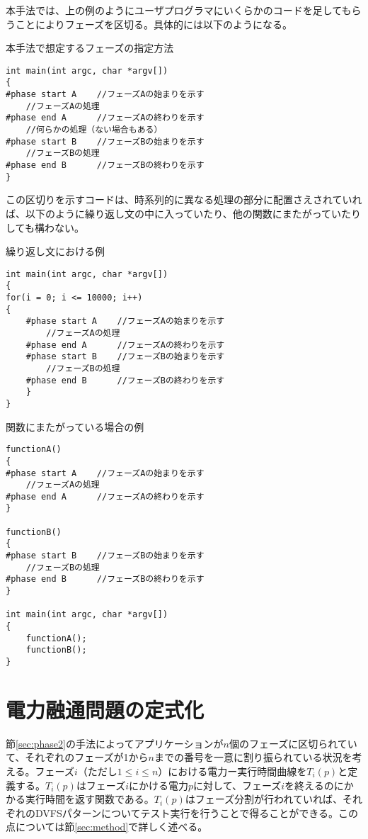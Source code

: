 本手法では、上の例のようにユーザプログラマにいくらかのコードを足してもらうことによりフェーズを区切る。具体的には以下のようになる。

{\small
\begin{itembox}[c]{本手法で想定するフェーズの指定方法}
\begin{verbatim}
int main(int argc, char *argv[])
{
#phase start A    //フェーズAの始まりを示す
    //フェーズAの処理
#phase end A      //フェーズAの終わりを示す
    //何らかの処理（ない場合もある）
#phase start B    //フェーズBの始まりを示す
    //フェーズBの処理
#phase end B      //フェーズBの終わりを示す
}
\end{verbatim}
\end{itembox}}

この区切りを示すコードは、時系列的に異なる処理の部分に配置さえされていれば、以下のように繰り返し文の中に入っていたり、他の関数にまたがっていたりしても構わない。

{\small
\begin{itembox}[c]{繰り返し文における例}
\begin{verbatim}
int main(int argc, char *argv[])
{
for(i = 0; i <= 10000; i++)
{
    #phase start A    //フェーズAの始まりを示す
        //フェーズAの処理
    #phase end A      //フェーズAの終わりを示す
    #phase start B    //フェーズBの始まりを示す
        //フェーズBの処理
    #phase end B      //フェーズBの終わりを示す
    }
}
\end{verbatim}
\end{itembox}}

{\small
\begin{itembox}[c]{関数にまたがっている場合の例}
\begin{verbatim}
functionA()
{
#phase start A    //フェーズAの始まりを示す
    //フェーズAの処理
#phase end A      //フェーズAの終わりを示す
}

functionB()
{
#phase start B    //フェーズBの始まりを示す
    //フェーズBの処理
#phase end B      //フェーズBの終わりを示す
}

int main(int argc, char *argv[])
{
    functionA();
    functionB();
}
\end{verbatim}
\end{itembox}}


\section{電力融通問題の定式化}
\label{sec:formularization}

節\ref{sec:phase2}の手法によってアプリケーションが$n$個のフェーズに区切られていて、それぞれのフェーズが1から$n$までの番号を一意に割り振られている状況を考える。フェーズ$i$（ただし$1\leq i\leq n$）における電力ー実行時間曲線を$T_i(p)$と定義する。$T_i(p)$はフェーズ$i$にかける電力$p$に対して、フェーズ$i$を終えるのにかかる実行時間を返す関数である。$T_i(p)$はフェーズ分割が行われていれば、それぞれのDVFSパターンについてテスト実行を行うことで得ることができる。この点については節\ref{sec:method}で詳しく述べる。

